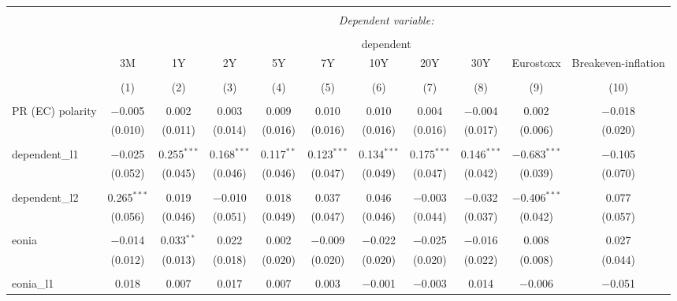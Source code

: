 \begin{table}[!htbp] \centering 
  \caption{} 
  \label{} 
\begin{adjustbox}{width=1.35\textwidth}
\begin{tabular}{@{\extracolsep{5pt}}lcccccccccc} 
\\[-1.8ex]\hline 
\hline \\[-1.8ex] 
 & \multicolumn{10}{c}{\textit{Dependent variable:}} \\ 
\cline{2-11} 
\\[-1.8ex] & \multicolumn{10}{c}{dependent} \\ 
 & 3M & 1Y & 2Y & 5Y & 7Y & 10Y & 20Y & 30Y & Eurostoxx & Breakeven-inflation \\ 
\\[-1.8ex] & (1) & (2) & (3) & (4) & (5) & (6) & (7) & (8) & (9) & (10)\\ 
\hline \\[-1.8ex] 
 PR (EC) polarity & $-$0.005 & 0.002 & 0.003 & 0.009 & 0.010 & 0.010 & 0.004 & $-$0.004 & 0.002 & $-$0.018 \\ 
  & (0.010) & (0.011) & (0.014) & (0.016) & (0.016) & (0.016) & (0.016) & (0.017) & (0.006) & (0.020) \\ 
  & & & & & & & & & & \\ 
 dependent\_l1 & $-$0.025 & 0.255$^{***}$ & 0.168$^{***}$ & 0.117$^{**}$ & 0.123$^{***}$ & 0.134$^{***}$ & 0.175$^{***}$ & 0.146$^{***}$ & $-$0.683$^{***}$ & $-$0.105 \\ 
  & (0.052) & (0.045) & (0.046) & (0.046) & (0.047) & (0.049) & (0.047) & (0.042) & (0.039) & (0.070) \\ 
  & & & & & & & & & & \\ 
 dependent\_l2 & 0.265$^{***}$ & 0.019 & $-$0.010 & 0.018 & 0.037 & 0.046 & $-$0.003 & $-$0.032 & $-$0.406$^{***}$ & 0.077 \\ 
  & (0.056) & (0.046) & (0.051) & (0.049) & (0.047) & (0.046) & (0.044) & (0.037) & (0.042) & (0.057) \\ 
  & & & & & & & & & & \\ 
 eonia & $-$0.014 & 0.033$^{**}$ & 0.022 & 0.002 & $-$0.009 & $-$0.022 & $-$0.025 & $-$0.016 & 0.008 & 0.027 \\ 
  & (0.012) & (0.013) & (0.018) & (0.020) & (0.020) & (0.020) & (0.020) & (0.022) & (0.008) & (0.044) \\ 
  & & & & & & & & & & \\ 
 eonia\_l1 & 0.018 & 0.007 & 0.017 & 0.007 & 0.003 & $-$0.001 & $-$0.003 & 0.014 & $-$0.006 & $-$0.051 \\ 

\end{tabular}
\end{adjustbox}
\end{table}
